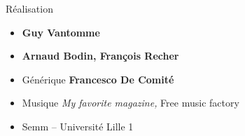 \begin{frame}
\begin{minipage}{0.72\textwidth}
  \bigskip

  Réalisation
  \begin{itemize}
    \item {\bf Guy Vantomme}  
    \item {\bf Arnaud Bodin, François Recher}
    \item {Générique {\bf Francesco De Comité}}
    \item {\small Musique \emph{My favorite magazine,} Free music factory}
    \item Semm -- Université Lille 1
  \end{itemize}

  \medskip
% 

  \end{minipage}  



\end{frame}


